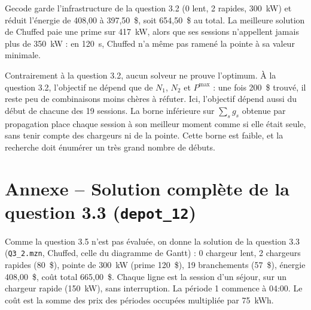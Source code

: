 \documentclass{article}
\begin{document}
Gecode garde l'infrastructure de la question 3.2 (0 lent, 2 rapides, 300~kW) et réduit l'énergie de 408,00 à 397,50~\$, soit 654,50~\$ au total. La meilleure solution de Chuffed paie une prime sur 417~kW, alors que ses sessions n'appellent jamais plus de 350~kW : en 120~s, Chuffed n'a même pas ramené la pointe à sa valeur minimale.

Contrairement à la question 3.2, aucun solveur ne prouve l'optimum. À la question 3.2, l'objectif ne dépend que de $N_1$, $N_2$ et $P^{\max}$ : une fois 200~\$ trouvé, il reste peu de combinaisons moins chères à réfuter. Ici, l'objectif dépend aussi du début de chacune des 19 sessions. La borne inférieure sur $\sum_s g_s$ obtenue par propagation place chaque session à son meilleur moment comme si elle était seule, sans tenir compte des chargeurs ni de la pointe. Cette borne est faible, et la recherche doit énumérer un très grand nombre de débuts.

\section*{Annexe -- Solution complète de la question 3.3 (\texttt{depot\_12})}

Comme la question 3.5 n'est pas évaluée, on donne la solution de la question 3.3 (\texttt{Q3\_2.mzn}, Chuffed, celle du diagramme de Gantt) : 0 chargeur lent, 2 chargeurs rapides (80~\$), pointe de 300~kW (prime 120~\$), 19 branchements (57~\$), énergie 408,00~\$, coût total 665,00~\$. Chaque ligne est la session d'un séjour, sur un chargeur rapide (150~kW), sans interruption. La période 1 commence à 04:00. Le coût est la somme des prix des périodes occupées multipliée par 75~kWh.
\end{document}
